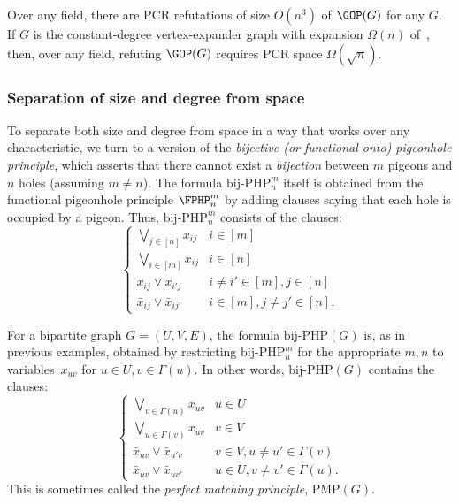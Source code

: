 \documentclass{toc}
\begin{document}
\begin{theorem}
Over any field, there are PCR refutations of size $O(n^{3})$ of $\GOP(G)$ for any $G$. If  $G$ is the constant-degree vertex-expander graph with 
expansion $\Omega(n)$ of~\cite{DBLP:journals/tocl/GalesiL10}, then, over any field, refuting $\GOP(G)$ requires PCR space $\Omega(\sqrt{n})$. 
\end{theorem}


\subsubsection{ Separation of size and degree from space}


To separate both size and degree from space in a way that works over any characteristic, we turn to a version
of the \emph{bijective  (or functional onto) pigeonhole principle}, which asserts that there cannot exist a \emph{bijection}
between $m$ pigeons and $n$ holes (assuming $m \neq n$). The formula $\mathrm{bij}$-$\mathrm{PHP}^{m}_n$
itself is obtained from the functional pigeonhole principle $\FPHP^m_n$ by adding clauses saying that
each hole is occupied by a pigeon. Thus, $\mathrm{bij}$-$\mathrm{PHP}^{m}_n$ consists of the clauses:
$$\left \{
\begin{array}{ll}
\bigvee_{j\in[n]}x_{ij}  & i \in [m]   \\
\bigvee_{i\in[m]}x_{ij}  & i \in [n] \\
\bar x_{ij} \vee \bar x_{i'j}  & i \not = i' \in [m],  j\in[n] \\
\bar x_{ij} \vee \bar x_{ij'}& i \in [m],  j \not = j'\in[n].
\end{array}
\right.
$$

For a bipartite graph $G=(U,V,E)$, the formula $\mathrm{bij}$-$\mathrm{PHP}(G)$ 
is, as in previous examples, obtained by restricting $\mathrm{bij}$-$\mathrm{PHP}^{m}_{n}$ 
for the appropriate $m,n$ to variables~$x_{uv}$ for $u\in U, v \in \Gamma(u)$.
In other words, $\mathrm{bij}$-$\mathrm{PHP}(G)$ contains the clauses: 
\[
\left \{
\begin{array}{ll}
\bigvee_{v\in\Gamma(u)}x_{uv}  & u \in U   \\
\bigvee_{u\in\Gamma(v)}x_{uv}  & v \in V   \\
\bar x_{uv} \vee \bar x_{u'v}  & v\in V,u \not = u' \in \Gamma(v) \\
\bar x_{uv} \vee \bar x_{uv'}&  u \in U,  v \not = v'\in \Gamma(u).
\end{array}
\right.
\]
This is sometimes called the \emph{perfect matching principle},
$\mathrm{PMP}(G)$.
\end{document}
